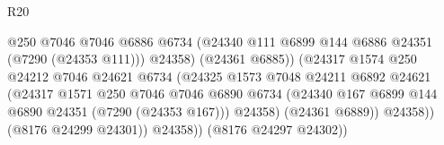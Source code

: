\begin{lexlean}{R20}
\begin{coremodule}
{                                                @250
                                                @7046
                                                @7046
                                                @6886
                                                @6734
                                                (@24340
                                                  @111
                                                  @6899
                                                  @144
                                                  @6886
                                                  @24351
                                                  (@7290 (@24353 @111)))
                                                @24358)
                                              (@24361 @6885))
                                            (@24317
                                              @1574
                                              @250
                                              @24212
                                              @7046
                                              @24621
                                              @6734
                                              (@24325
                                                @1573
                                                @7048
                                                @24211
                                                @6892
                                                @24621
                                                (@24317
                                                  @1571
                                                  @250
                                                  @7046
                                                  @7046
                                                  @6890
                                                  @6734
                                                  (@24340
                                                    @167
                                                    @6899
                                                    @144
                                                    @6890
                                                    @24351
                                                    (@7290 (@24353 @167)))
                                                  @24358)
                                                (@24361 @6889))
                                              @24358))
                                          (@8176 @24299 @24301))
                                        @24358))
                                    (@8176 @24297 @24302))
}
\end{coremodule}
\end{lexlean}
